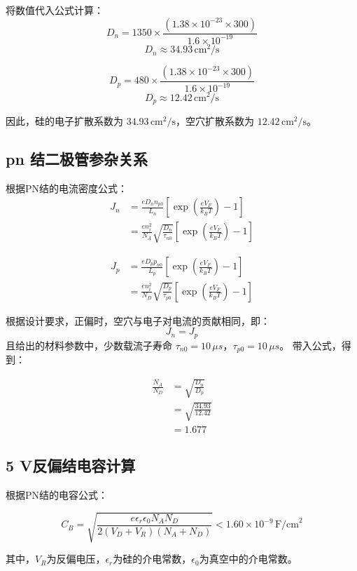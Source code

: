 \documentclass[12pt,hyperref,a4paper,UTF8]{ctexart}
\begin{document}
将数值代入公式计算：
\[ D_n = 1350 \times \frac{(1.38 \times 10^{-23} \times 300)}{1.6 \times 10^{-19}} \]
\[ D_n \approx 34.93 \, \text{cm}^2/\text{s} \]

\[ D_p = 480 \times \frac{(1.38 \times 10^{-23} \times 300)}{1.6 \times 10^{-19}} \]
\[ D_p \approx 12.42 \, \text{cm}^2/\text{s} \]

因此，硅的电子扩散系数为 $34.93 \, \text{cm}^2/\text{s}$，空穴扩散系数为 $12.42 \, \text{cm}^2/\text{s}$。

\subsection*{pn 结二极管参杂关系}


根据PN结的电流密度公式：
\begin{align*}
J_n &= \frac{e D_n n_{p0}}{L_n} \left[ \exp\left(\frac{e V_F}{k_B T}\right) - 1 \right] \\
    &= \frac{e n_i^2}{N_A} \sqrt{\frac{D_n}{\tau_{n0}}} \left[ \exp\left(\frac{e V_F}{k_B T}\right) - 1 \right]
\end{align*}

\begin{align*}
J_p &= \frac{e D_p p_{n0}}{L_p} \left[ \exp\left(\frac{e V_F}{k_B T}\right) - 1 \right] \\
    &= \frac{e n_i^2}{N_D} \sqrt{\frac{D_p}{\tau_{p0}}} \left[ \exp\left(\frac{e V_F}{k_B T}\right) - 1 \right]
\end{align*}

根据设计要求，正偏时，空穴与电子对电流的贡献相同，即：$$J_n = J_p$$
且给出的材料参数中，少数载流子寿命 $\tau_{n0} = 10 \, \mu s$，$\tau_{p0} = 10 \, \mu s$。
带入公式，得到：

\begin{align*}
\frac{N_A}{N_D} &= \sqrt{\frac{D_n}{D_p}} \\
                &= \sqrt{\frac{34.93}{12.42}}\\
                &= 1.677
\end{align*}

\subsection*{5 V反偏结电容计算}

根据PN结的电容公式：

\[ C_B = \sqrt{\frac{e \epsilon_r \epsilon_0 N_A N_D}{2(V_D + V_R)(N_A + N_D)}} < 1.60 \times 10^{-9} \, \text{F/cm}^2 \]

其中，$V_R$为反偏电压，\(\epsilon_r\)为硅的介电常数，\(\epsilon_0\)为真空中的介电常数。
\end{document}
